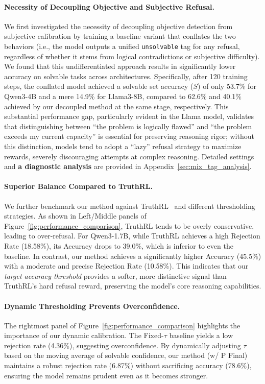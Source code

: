 \paragraph{Necessity of Decoupling Objective and Subjective Refusal.} 
We first investigated the necessity of decoupling objective detection from subjective calibration by training a baseline variant that conflates the two behaviors (i.e., the model outputs a unified \texttt{unsolvable} tag for any refusal, regardless of whether it stems from logical contradictions or subjective difficulty). We found that this undifferentiated approach results in significantly lower accuracy on solvable tasks across architectures.
Specifically, after 120 training steps, the conflated model achieved a solvable set accuracy ($S$) of only 53.7\% for Qwen3-4B and a mere 14.9\% for Llama3-8B, compared to 62.6\% and 40.1\% achieved by our decoupled method at the same stage, respectively. This substantial performance gap, particularly evident in the Llama model, validates that distinguishing between ``the problem is logically flawed'' and ``the problem exceeds my current capacity'' is essential for preserving reasoning rigor; without this distinction, models tend to adopt a ``lazy'' refusal strategy to maximize rewards, severely discouraging attempts at complex reasoning. 
Detailed settings and \textbf{a diagnostic analysis} are provided in Appendix~\ref{sec:mix_tag_analysis}.


\paragraph{Superior Balance Compared to TruthRL.} We further benchmark our method against TruthRL~\citep{wei2025truthrl} and different thresholding strategies. 
As shown in Left/Middle panels of Figure~\ref{fig:performance_comparison}, TruthRL tends to be overly conservative, leading to over-refusal. For Qwen3-1.7B, while TruthRL achieves a high Rejection Rate (18.58\%), its Accuracy drops to 39.0\%, which is inferior to even the baseline. In contrast, our method achieves a significantly higher Accuracy (45.5\%) with a moderate and precise Rejection Rate (10.58\%). This indicates that our \textit{target accuracy threshold} provides a softer, more distinctive signal than TruthRL's hard refusal reward, preserving the model's core reasoning capabilities.

\paragraph{Dynamic Thresholding Prevents Overconfidence.}
The rightmost panel of Figure~\ref{fig:performance_comparison} highlights the importance of our dynamic calibration. The Fixed-$\tau$ baseline yields a low rejection rate (4.36\%), suggesting overconfidence. By dynamically adjusting $\tau$ based on the moving average of solvable confidence, our method (w/ P Final) maintains a robust rejection rate (6.87\%) without sacrificing accuracy (78.6\%), ensuring the model remains prudent even as it becomes stronger.
